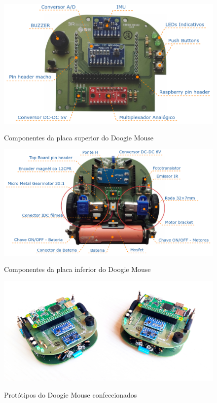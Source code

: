     
\begin{figure}[H]
	\centering
	\caption{Componentes da placa superior do Doogie Mouse}
	\includegraphics[width=1\textwidth]
	{Figures/top_board_elementos.png}
	\label{fig:top_board_elementos}
\end{figure}

\begin{figure}[H]
	\centering
	\caption{Componentes da placa inferior do Doogie Mouse}
	\includegraphics[width=1\textwidth]
	{Figures/bottom_board_elementos.png}
	\label{fig:bottom_board_elementos}
\end{figure}

\begin{figure}[H]
	\centering
	\caption{Protótipos do Doogie Mouse confeccionados}
	\includegraphics[width=1\textwidth]
	{Figures/doogie_mouse_prototipos}
	\label{fig:prototipos}
\end{figure}

